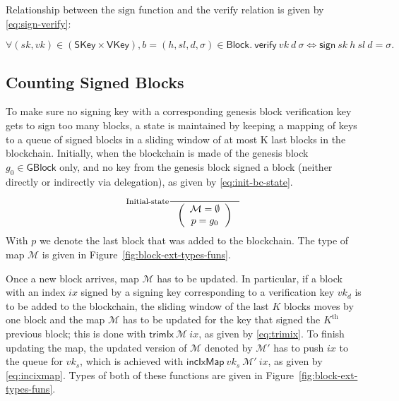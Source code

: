 \documentclass[11pt,a4paper]{article}
\newcommand{\fun}[1]{\mathsf{#1}}
\newcommand{\type}[1]{\mathsf{#1}}
\newcommand{\GBlock}{\type{GBlock}}
\newcommand{\Block}{\type{Block}}
\newcommand{\SKey}{\type{SKey}}
\newcommand{\VKey}{\type{VKey}}
\newcommand{\signname}{sign}
\newcommand{\verifyname}{verify}
\newcommand{\signmapname}{\mathcal{M}}
\newcommand{\trimixname}{trimIx}
\newcommand{\incixmapname}{incIxMap}
\newcommand{\sign}[4]{\fun{\signname}\ #1 ~ #2 ~ #3 ~ #4}
\newcommand{\verify}[3]{\fun{\verifyname} ~ #1 ~ #2 ~ #3}
\newcommand{\trimix}[2]{\fun{\trimixname} ~ #1 ~ #2}
\newcommand{\incixmap}[3]{\fun{\incixmapname} ~ #1 ~ #2 ~ #3}
\begin{document}
Relationship between the $\text{\signname}$ function and the
$\text{\verifyname}$ relation is given by \eqref{eq:sign-verify}:

\begin{equation}
  \label{eq:sign-verify}
  \forall (sk, vk) \in (\SKey \times \VKey), b = (h, sl, d, \sigma) \in \Block.\
  \verify{vk}{d}{\sigma} \iff \sign{sk}{h}{sl}{d} = \sigma.
\end{equation}


\subsection{Counting Signed Blocks}
\label{sec:counting-signed-blocks}

To make sure no signing key with a corresponding genesis block verification
key gets to sign too many blocks, a state is maintained by keeping a mapping
of keys to a queue of signed blocks in a sliding window of at most K last
blocks in the blockchain.
%
Initially, when the blockchain is made of the genesis block $g_0 \in \GBlock$
only, and no key from the genesis block signed a block (neither directly or
indirectly via delegation), as given by \eqref{eq:init-bc-state}.

\begin{equation}
  \label{eq:init-bc-state}
  \inference[Initial-state]
  {}
  {\left(
      {\begin{array}{c}
        \signmapname = \emptyset \\
        p = g_0
      \end{array}}
  \right)
  }
\end{equation}
%
With $p$ we denote the last block that was added to the blockchain.
%
The type of map $\signmapname$ is given in
Figure~\ref{fig:block-ext-types-funs}.

Once a new block arrives, map $\signmapname$ has to be updated.
%
In particular, if a block with an index $ix$ signed by a signing key
corresponding to a verification key $vk_d$ is to be added to the blockchain,
the sliding window of the last $K$ blocks moves by one block and the map
$\signmapname$ has to be updated for the key that signed the $K^{\text{th}}$
previous block;
%
this is done with $\trimix{\signmapname}{ix}$, as given by
\eqref{eq:trimix}.
%
To finish updating the map, the updated version of $\signmapname$ denoted by
$\signmapname'$ has to push $ix$ to the queue for $vk_s$, which is achieved
with $\incixmap{vk_s}{\signmapname'}{ix}$, as given by
\eqref{eq:incixmap}.
%
Types of both of these functions are given in
Figure~\ref{fig:block-ext-types-funs}.
\end{document}
